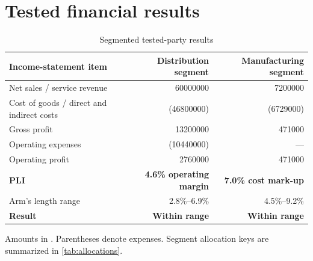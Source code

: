 \section{Tested financial results}
\begin{table}[htbp]
  \centering
  \caption{Segmented tested-party results}
  \label{tab:testedresults}
  \begin{tabularx}{\textwidth}{@{}Y r r@{}}
    \toprule
    \textbf{Income-statement item} & \textbf{Distribution segment} &
      \textbf{Manufacturing segment}\\
    \midrule
    Net sales / service revenue & \num{60000000} & \num{7200000}\\
    Cost of goods / direct and indirect costs & (\num{46800000}) & (\num{6729000})\\
    Gross profit & \num{13200000} & \num{471000}\\
    Operating expenses & (\num{10440000}) & ---\\
    Operating profit & \num{2760000} & \num{471000}\\
    \midrule
    \textbf{PLI} & \textbf{4.6\% operating margin} & \textbf{7.0\% cost mark-up}\\
    Arm's length range & 2.8\%--6.9\% & 4.5\%--9.2\%\\
    \textbf{Result} & \textbf{Within range} & \textbf{Within range}\\
    \bottomrule
  \end{tabularx}
  \begin{flushleft}\footnotesize
    Amounts in \Currency. Parentheses denote expenses. Segment allocation keys
    are summarized in \cref{tab:allocations}.
  \end{flushleft}
\end{table}
